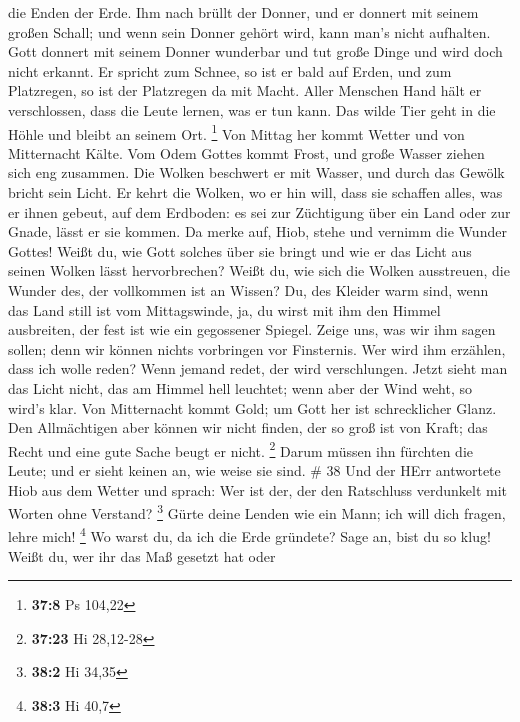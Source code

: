 die Enden der Erde.  Ihm nach brüllt der Donner, und er
donnert mit seinem großen Schall; und wenn sein Donner gehört wird, kann
man's nicht aufhalten.  Gott donnert mit seinem Donner
wunderbar und tut große Dinge und wird doch nicht erkannt. 
Er spricht zum Schnee, so ist er bald auf Erden, und zum Platzregen, so
ist der Platzregen da mit Macht.  Aller Menschen Hand hält
er verschlossen, dass die Leute lernen, was er tun kann. 
Das wilde Tier geht in die Höhle und bleibt an seinem Ort. \footnote{\textbf{37:8}
  Ps 104,22}  Von Mittag her kommt Wetter und von
Mitternacht Kälte.  Vom Odem Gottes kommt Frost, und große
Wasser ziehen sich eng zusammen.  Die Wolken beschwert er
mit Wasser, und durch das Gewölk bricht sein Licht.  Er
kehrt die Wolken, wo er hin will, dass sie schaffen alles, was er ihnen
gebeut, auf dem Erdboden:  es sei zur Züchtigung über ein
Land oder zur Gnade, lässt er sie kommen.  Da merke auf,
Hiob, stehe und vernimm die Wunder Gottes!  Weißt du, wie
Gott solches über sie bringt und wie er das Licht aus seinen Wolken
lässt hervorbrechen?  Weißt du, wie sich die Wolken
ausstreuen, die Wunder des, der vollkommen ist an Wissen? 
Du, des Kleider warm sind, wenn das Land still ist vom Mittagswinde,
 ja, du wirst mit ihm den Himmel ausbreiten, der fest ist
wie ein gegossener Spiegel.  Zeige uns, was wir ihm sagen
sollen; denn wir können nichts vorbringen vor Finsternis. 
Wer wird ihm erzählen, dass ich wolle reden? Wenn jemand redet, der wird
verschlungen.  Jetzt sieht man das Licht nicht, das am
Himmel hell leuchtet; wenn aber der Wind weht, so wird's klar.
 Von Mitternacht kommt Gold; um Gott her ist schrecklicher
Glanz.  Den Allmächtigen aber können wir nicht finden, der
so groß ist von Kraft; das Recht und eine gute Sache beugt er nicht.
\footnote{\textbf{37:23} Hi 28,12-28}  Darum müssen ihn
fürchten die Leute; und er sieht keinen an, wie weise sie sind. \# 38
 Und der HErr antwortete Hiob aus dem Wetter und sprach:
 Wer ist der, der den Ratschluss verdunkelt mit Worten ohne
Verstand? \footnote{\textbf{38:2} Hi 34,35}  Gürte deine
Lenden wie ein Mann; ich will dich fragen, lehre mich! \footnote{\textbf{38:3}
  Hi 40,7}  Wo warst du, da ich die Erde gründete? Sage an,
bist du so klug!  Weißt du, wer ihr das Maß gesetzt hat oder
